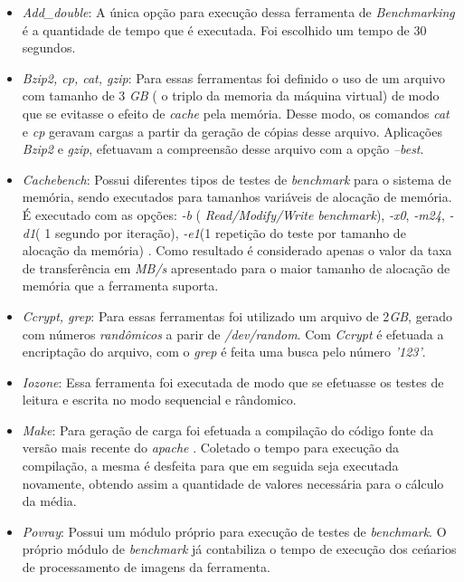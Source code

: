 \begin{itemize}
\item \textit{Add\_double}: A única opção para execução dessa ferramenta de \textit{Benchmarking} é a quantidade de tempo que é executada. Foi escolhido um tempo de 30 segundos.

\item \textit{Bzip2, cp, cat, gzip}: Para essas ferramentas foi definido o uso de um arquivo com tamanho de 3 \textit{GB} ( o triplo da memoria da máquina virtual) de modo que se evitasse o efeito de \textit{cache} pela memória. Desse modo, os comandos \textit{cat} e \textit{cp} geravam cargas a partir da geração de cópias desse arquivo. Aplicações \textit{Bzip2} e \textit{gzip}, efetuavam a compreensão desse arquivo com a opção \textit{--best}.

\item \textit{Cachebench}: Possui diferentes tipos de testes de \textit{benchmark} para o sistema de memória, sendo executados para tamanhos variáveis de alocação de memória. É executado com as opções: \textit{-b} ( \textit{Read/Modify/Write benchmark}), \textit{-x0}, \textit{-m24}, \textit{-d1}( 1 segundo por iteração), \textit{-e1}(1 repetição do teste por tamanho de alocação da memória) . Como resultado é considerado apenas o valor da taxa de transferência em \textit{MB/s} apresentado para o maior tamanho de alocação de memória que a ferramenta suporta.

\item  \textit{Ccrypt, grep}: Para essas ferramentas foi utilizado um arquivo de 2\textit{GB}, gerado com números \textit{randômicos} a parir de \textit{/dev/random}. Com \textit{Ccrypt} é efetuada a encriptação do arquivo, com o \textit{grep} é feita uma busca pelo número \textit{'123'}.

\item \textit{Iozone}: Essa ferramenta foi executada de modo que se efetuasse os testes de leitura e escrita no modo sequencial e rândomico.

\item \textit{Make}: Para geração de carga foi efetuada a compilação do código fonte da versão mais recente do \textit{apache} \footnotemark[8]                                                                                                                              . Coletado o tempo para execução da compilação, a mesma é desfeita para que em seguida seja executada novamente, obtendo assim a quantidade de valores necessária para o cálculo da média.

\item \textit{Povray}: Possui um módulo próprio para execução de testes de \textit{benchmark}. O próprio módulo de \textit{benchmark} já contabiliza o tempo de execução dos ceńarios de processamento de imagens da ferramenta. 

\end{itemize}

